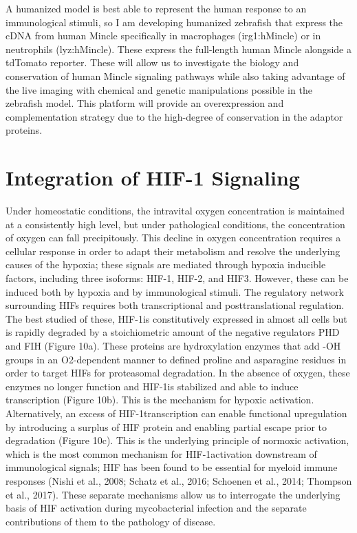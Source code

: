 A humanized model is best able to represent the human response to an immunological stimuli, so I am developing humanized zebrafish that express the cDNA from human Mincle specifically in macrophages (irg1:hMincle) or in neutrophils (lyz:hMincle). These express the full-length human Mincle alongside a tdTomato reporter. These will allow us to investigate the biology and conservation of human Mincle signaling pathways while also taking advantage of the live imaging with chemical and genetic manipulations possible in the zebrafish model. This platform will provide an overexpression and complementation strategy due to the high-degree of conservation in the adaptor proteins. 

\section{Integration of HIF-1\textalpha{} Signaling}

Under homeostatic conditions, the intravital oxygen concentration is maintained at a consistently high level, but under pathological conditions, the concentration of oxygen can fall precipitously. This decline in oxygen concentration requires a cellular response in order to adapt their metabolism and resolve the underlying causes of the hypoxia; these signals are mediated through hypoxia inducible factors, including three isoforms: HIF-1\textalpha, HIF-2\textalpha, and HIF3\textalpha{}. However, these can be induced both by hypoxia and by immunological stimuli. The regulatory network surrounding HIFs requires both transcriptional and posttranslational regulation. The best studied of these, HIF-1\textalpha is constitutively expressed in almost all cells but is rapidly degraded by a stoichiometric amount of the negative regulators PHD and FIH (Figure 10a). These proteins are hydroxylation enzymes that add -OH groups in an O2-dependent manner to defined proline and asparagine residues in order to target HIFs for proteasomal degradation. In the absence of oxygen, these enzymes no longer function and HIF-1\textalpha is stabilized and able to induce transcription (Figure 10b). This is the mechanism for hypoxic activation. Alternatively, an excess of HIF-1\textalpha transcription can enable functional upregulation by introducing a surplus of HIF protein and enabling partial escape prior to degradation (Figure 10c). This is the underlying principle of normoxic activation, which is the most common mechanism for HIF-1\textalpha activation downstream of immunological signals; HIF has been found to be essential for myeloid immune responses (Nishi et al., 2008; Schatz et al., 2016; Schoenen et al., 2014; Thompson et al., 2017). These separate mechanisms allow us to interrogate the underlying basis of HIF activation during mycobacterial infection and the separate contributions of them to the pathology of disease. 

